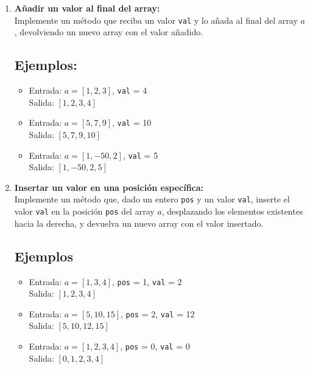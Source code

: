 \begin{enumerate}[label=\alph*)]
    \item \textbf{Añadir un valor al final del array:} \\
    Implemente un método que reciba un valor \texttt{val} y lo añada al final del array \(a\), devolviendo un nuevo array con el valor añadido.
    
    \subsection*{Ejemplos:}
    \begin{itemize}
        \item Entrada: \(a = [1, 2, 3]\), \texttt{val} = 4 \\
        Salida: \([1, 2, 3, 4]\)
        \item Entrada: \(a = [5, 7, 9]\), \texttt{val} = 10 \\
        Salida: \([5, 7, 9, 10]\)
        \item Entrada: \(a = [1, -50, 2]\), \texttt{val} = 5 \\
        Salida: \([1, -50, 2, 5]\)
    \end{itemize}

    \item \textbf{Insertar un valor en una posición específica:} \\
    Implemente un método que, dado un entero \texttt{pos} y un valor \texttt{val}, inserte el valor \texttt{val} en la posición \texttt{pos} del array \(a\), desplazando los elementos existentes hacia la derecha, y devuelva un nuevo array con el valor insertado.
    
    \subsection*{Ejemplos}
    \begin{itemize}
        \item Entrada: \(a = [1, 3, 4]\), \texttt{pos} = 1, \texttt{val} = 2 \\
        Salida: \([1, 2, 3, 4]\)
        \item Entrada: \(a = [5, 10, 15]\), \texttt{pos} = 2, \texttt{val} = 12 \\
        Salida: \([5, 10, 12, 15]\)
        \item Entrada: \(a = [1, 2, 3, 4]\), \texttt{pos} = 0, \texttt{val} = 0 \\
        Salida: \([0, 1, 2, 3, 4]\)
    \end{itemize}


\end{enumerate}
